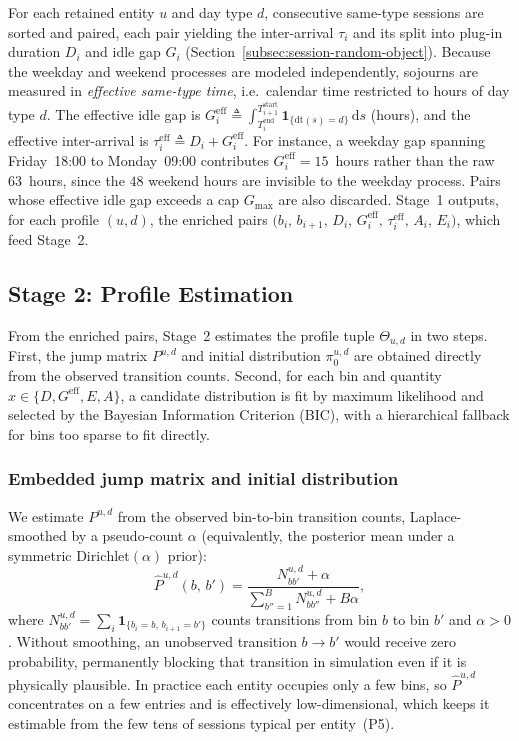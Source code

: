 \documentclass[journal]{IEEEtran}
\begin{document}
For each retained entity $u$ and day type $d$, consecutive same-type sessions are sorted and paired, each pair yielding the inter-arrival $\tau_i$ and its split into plug-in duration $D_i$ and idle gap $G_i$ (Section~\ref{subsec:session-random-object}). Because the weekday and weekend processes are modeled independently, sojourns are measured in \emph{effective same-type time}, i.e.\ calendar time restricted to hours of day type $d$. The effective idle gap is $G_i^{\mathrm{eff}} \triangleq \int_{T_i^{\mathrm{end}}}^{T_{i+1}^{\mathrm{start}}} \mathbf{1}_{\{\mathrm{dt}(s) = d\}}\, \mathrm{d}s$ (hours), and the effective inter-arrival is $\tau_i^{\mathrm{eff}} \triangleq D_i + G_i^{\mathrm{eff}}$. For instance, a weekday gap spanning Friday~18:00 to Monday~09:00 contributes $G_i^{\mathrm{eff}} = 15$~hours rather than the raw $63$~hours, since the $48$ weekend hours are invisible to the weekday process. Pairs whose effective idle gap exceeds a cap $G_{\max}$ are also discarded. Stage~1 outputs, for each profile $(u, d)$, the enriched pairs $\bigl(b_i,\, b_{i+1},\, D_i,\, G_i^{\mathrm{eff}},\, \tau_i^{\mathrm{eff}},\, A_i,\, E_i\bigr)$, which feed Stage~2.

\subsection{Stage 2: Profile Estimation}
\label{subsec:stage2}

From the enriched pairs, Stage~2 estimates the profile tuple $\Theta_{u,d}$ in two steps. First, the jump matrix $P^{u,d}$ and initial distribution $\pi_0^{u,d}$ are obtained directly from the observed transition counts. Second, for each bin and quantity $x \in \{D, G^{\mathrm{eff}}, E, A\}$, a candidate distribution is fit by maximum likelihood and selected by the Bayesian Information Criterion (BIC), with a hierarchical fallback for bins too sparse to fit directly.

\subsubsection{Embedded jump matrix and initial distribution}

We estimate $P^{u,d}$ from the observed bin-to-bin transition counts, Laplace-smoothed by a pseudo-count $\alpha$ (equivalently, the posterior mean under a symmetric $\mathrm{Dirichlet}(\alpha)$ prior):
\begin{equation}
    \hat{P}^{u,d}(b,\, b') =
    \frac{N_{bb'}^{u,d} + \alpha}
         {\displaystyle\sum_{b''=1}^{B} N_{bb''}^{u,d} + B\alpha},
    \label{eq:jump-matrix-est}
\end{equation}
where $N_{bb'}^{u,d} = \sum_i \mathbf{1}_{\{b_i = b,\, b_{i+1} = b'\}}$ counts transitions from bin $b$ to bin $b'$ and $\alpha > 0$. Without smoothing, an unobserved transition $b \to b'$ would receive zero probability, permanently blocking that transition in simulation even if it is physically plausible. In practice each entity occupies only a few bins, so $\hat{P}^{u,d}$ concentrates on a few entries and is effectively low-dimensional, which keeps it estimable from the few tens of sessions typical per entity~(P5).
\end{document}

